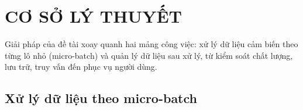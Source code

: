 \chapter{CƠ SỞ LÝ THUYẾT}
\label{chap:2-background}

Giải pháp của đề tài xoay quanh hai mảng công việc: xử lý dữ liệu cảm biến theo từng lô nhỏ (micro-batch) và quản lý dữ liệu sau xử lý, từ kiểm soát chất lượng, lưu trữ, truy vấn đến phục vụ người dùng. 

\section{Xử lý dữ liệu theo micro-batch}
\label{sec:2-microbatch}












